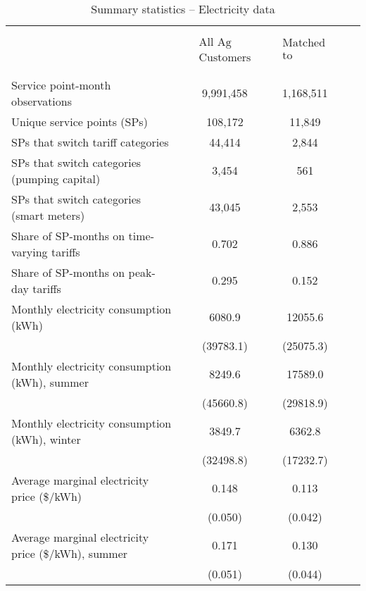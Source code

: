\begin{table}\centering
\caption{\normalsize Summary statistics -- Electricity data}
\label{tab:elec_summary_stats}
\begin{tabular}{lrcrcrr}
\hline
\hline
\\ 
\vspace{-8mm}
\\
&& $\begin{matrix}\text{All Ag}\\ \text{Customers}\end{matrix}$  && $\begin{matrix}\text{Matched} \\ \text{to Pumps}\end{matrix}$ \\
[.1em]
\cline{3-5}
\\
\vspace{-7mm}
\\
Service point-month observations && 9,991,458 && 1,168,511 \\ 
[.2em]
Unique service points (SPs) && 108,172 && 11,849 \\ 
[.2em]
SPs that switch tariff categories  && 44,414 && 2,844   \\
[.2em]
SPs that switch categories (pumping capital)  && 3,454 && 561   \\
[.2em]
SPs that switch categories (smart meters)  && 43,045 && 2,553   \\
[.2em]
Share of SP-months on time-varying tariffs  && 0.702 && 0.886   \\
[.2em]
Share of SP-months on peak-day tariffs  && 0.295 && 0.152   \\
[1.4em]
Monthly electricity consumption (kWh) && 6080.9 && 12055.6   \\
 && (39783.1) && (25075.3)   \\
[.4em]
Monthly electricity consumption (kWh), summer && 8249.6 && 17589.0   \\
 && (45660.8) && (29818.9)   \\
[.4em]
Monthly electricity consumption (kWh), winter && 3849.7 && 6362.8   \\
 && (32498.8) && (17232.7)   \\
[1.4em]
Average marginal electricity price (\$/kWh) && 0.148 && 0.113   \\
 && (0.050) && (0.042)   \\
[.4em]
Average marginal electricity price (\$/kWh), summer && 0.171 && 0.130   \\
 && (0.051) && (0.044)   \\

\end{tabular}
\end{table}
